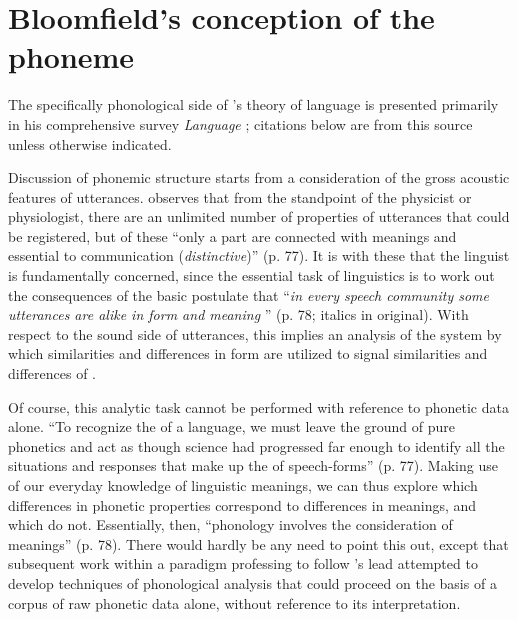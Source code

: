 \section{Bloomfield's conception of the phoneme}

The specifically phonological side of {\Bloomfield}'s theory of language
is presented primarily in his comprehensive survey \textsl{Language}
\citep{bloomfield:lg}; citations below are from this source unless
otherwise indicated.

Discussion of phonemic structure starts from a consideration of the
gross acoustic features of utterances. {\Bloomfield} observes that from
the standpoint of the physicist or physiologist, there are an
unlimited number of properties of utterances that could be registered,
but of these ``only a part are connected with meanings and essential to
communication (\emph{distinctive})'' (p. 77). It is with these that the
linguist is fundamentally concerned, since the essential task of
linguistics is to work out the consequences of the basic postulate
that ``\emph{in every speech community some utterances are alike in
  form and meaning} '' (p. 78; italics in original). With respect to
the sound side of utterances, this implies an analysis of the system
by which similarities and differences in form are utilized to signal
similarities and differences of .

Of course, this analytic task cannot be performed with reference to
phonetic data alone. ``To recognize the  of a
language, we must leave the ground of pure phonetics and act as though
science had progressed far enough to identify all the situations and
responses that make up the  of speech-forms'' (p. 77). Making
use of our everyday knowledge of linguistic meanings, we can thus
explore which differences in phonetic properties correspond to
differences in meanings, and which do not. Essentially, then,
``phonology involves the consideration of meanings'' (p. 78). There
would hardly be any need to point this out, except that subsequent
work within a paradigm professing to follow {\Bloomfield}'s lead
attempted to develop techniques of phonological analysis that could
proceed on the basis of a corpus of raw phonetic data alone, without
reference to its interpretation.

